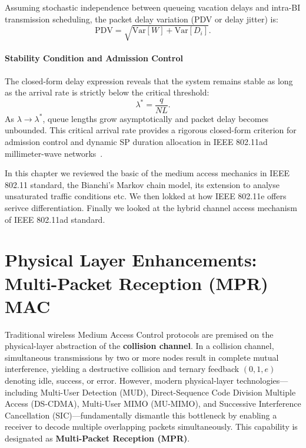 Assuming stochastic independence between queueing vacation delays and intra-BI transmission scheduling, the packet delay variation (PDV or delay jitter) is:
\begin{equation}
    \mathrm{PDV} = \sqrt{\mathrm{Var}[W] + \mathrm{Var}[D_i]}.
\end{equation}

\subsubsection{Stability Condition and Admission Control}
The closed-form delay expression reveals that the system remains stable as long as the arrival rate is strictly below the critical threshold:
\begin{equation}
    \lambda^* = \frac{q}{N L}.
\end{equation}
As $\lambda \to \lambda^*$, queue lengths grow asymptotically and packet delay becomes unbounded. This critical arrival rate provides a rigorous closed-form criterion for admission control and dynamic SP duration allocation in IEEE 802.11ad millimeter-wave networks~\cite{hemanth2014iet, hemanth2019tett}.

In this chapter we reviewed the basic of the medium access mechanics in IEEE 802.11 standard, the Bianchi's Markov chain model, its extension to analyse unsaturated traffic conditions etc. We then lokked at how IEEE 802.11e offers serivce differentiation. Finally we looked at the hybrid channel access mechanism of IEEE 802.11ad standard.

\chapter{Physical Layer Enhancements: Multi-Packet Reception (MPR) MAC}
Traditional wireless Medium Access Control protocols are premised on the physical-layer abstraction of the \textbf{collision channel}. In a collision channel, simultaneous transmissions by two or more nodes result in complete mutual interference, yielding a destructive collision and ternary feedback $(0, 1, e)$ denoting idle, success, or error. However, modern physical-layer technologies---including Multi-User Detection (MUD), Direct-Sequence Code Division Multiple Access (DS-CDMA), Multi-User MIMO (MU-MIMO), and Successive Interference Cancellation (SIC)---fundamentally dismantle this bottleneck by enabling a receiver to decode multiple overlapping packets simultaneously. This capability is designated as \textbf{Multi-Packet Reception (MPR)}.

